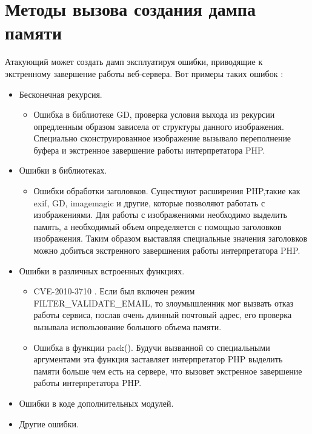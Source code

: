 \documentclass[20pt]{article}
\begin{document}
\newpage

\section{Методы вызова создания дампа памяти}

Атакующий может создать дамп эксплуатируя ошибки, приводящие к экстренному
завершение работы веб-сервера. Вот примеры таких ошибок \cite{php/crash}:
\begin{itemize}
  \item  Бесконечная рекурсия.
    \begin{itemize}
      \item Ошибка в библиотеке GD, проверка условия выхода из рекурсии
      опредленным образом зависела от структуры данного изображения. Специально
      сконструированное изображение вызывало переполнение буфера и экстренное
      завершение работы интерпретатора PHP.
    \end{itemize}
  \item Ошибки в библиотеках.
    \begin{itemize}
      \item Ошибки обработки заголовков. Существуют расширения PHP,такие как exif, GD,
        imagemagic и другие, которые позволяют работать с изображениями. Для работы
        с изображениями необходимо выделить память, а необходимый объем определяется
        с помощью заголовков изображения. Таким образом выставляя специальные значения
        заголовков можно добиться экстренного завершнения работы интерпретатора PHP.
    \end{itemize}
  \item Ошибки в различных встроенных функциях.
    \begin{itemize}
      \item CVE-2010-3710 \cite{cve-2010-3710}. Если был включен режим
      FILTER\_VALIDATE\_EMAIL, то злоумышленник мог вызвать отказ работы сервиса,
      послав очень длинный почтовый адрес, его проверка вызывала использование
      большого объема памяти.
      \item Ошибка в функции pack(). Будучи вызванной со специальными аргументами
      эта функция заставляет интерпретатор PHP выделить памяти больше чем есть
      на сервере, что вызовет экстренное завершение работы интерпретатора PHP.
    \end{itemize}
 \item Ошибки в коде дополнительных модулей.
 \item Другие ошибки.
\end{itemize}
\end{document}
